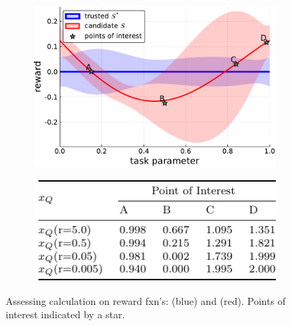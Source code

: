 \begin{figure}[tbp]
    \centering
    \begin{subfigure}[c]{0.65\linewidth}
        \centering
        \includegraphics[width=1.0\linewidth]{Figures/p1.pdf}
        \vfill
    \end{subfigure}%
    \hfill
    \begin{subfigure}[t]{0.35\linewidth}
        \centering
        \includegraphics[width=1.0\linewidth]{Figures/p1_table.pdf}
    \end{subfigure} 
    \caption{Assessing \xQ{} calculation on reward fxn's: \solvestar{} (blue) and \solve{} (red). Points of interest indicated by a star.}
    \label{fig:sq_thry1}
\end{figure}
